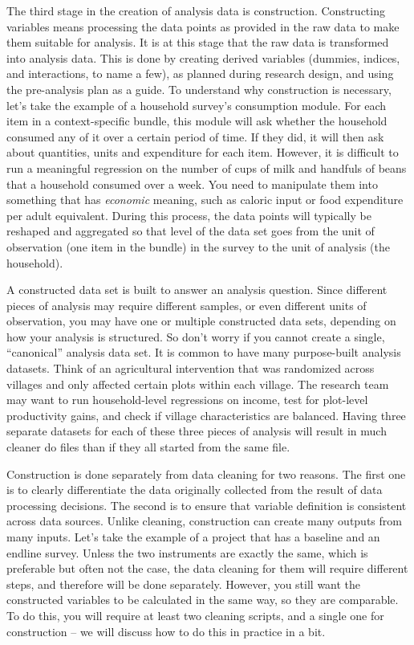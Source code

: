The third stage in the creation of analysis data is construction.
Constructing variables means processing the data points as provided in the raw data to make them suitable for analysis.
It is at this stage that the raw data is transformed into analysis data.
This is done by creating derived variables (dummies, indices, and interactions, to name a few),
as planned during research design,
and using the pre-analysis plan as a guide.
To understand why construction is necessary,
let's take the example of a household survey's consumption module.
For each item in a context-specific bundle,
this module will ask whether the household consumed any of it over a certain period of time.
If they did, it will then ask about quantities, units and expenditure for each item.
However, it is difficult to run a meaningful regression
on the number of cups of milk and handfuls of beans that a household consumed over a week.
You need to manipulate them into something that has \textit{economic} meaning,
such as caloric input or food expenditure per adult equivalent.
During this process, the data points will typically be reshaped and aggregated
so that level of the data set goes from the unit of observation
(one item in the bundle) in the survey to the unit of analysis (the household).

A constructed data set is built to answer an analysis question.
Since different pieces of analysis may require different samples,
or even different units of observation,
you may have one or multiple constructed data sets,
depending on how your analysis is structured.
So don't worry if you cannot create a single, ``canonical'' analysis data set.
It is common to have many purpose-built analysis datasets.
Think of an agricultural intervention that was randomized across villages
and only affected certain plots within each village.
The research team may want to run household-level regressions on income,
test for plot-level productivity gains,
and check if village characteristics are balanced.
Having three separate datasets for each of these three pieces of analysis
will result in much cleaner do files than if they all started from the same file.

Construction is done separately from data cleaning for two reasons.
The first one is to clearly differentiate the data originally collected
from the result of data processing decisions.
The second is to ensure that variable definition is consistent across data sources.
Unlike cleaning, construction can create many outputs from many inputs.
Let's take the example of a project that has a baseline and an endline survey.
Unless the two instruments are exactly the same,
which is preferable but often not the case,
the data cleaning for them will require different steps,
and therefore will be done separately.
However, you still want the constructed variables to be calculated in the same way, so they are comparable.
To do this, you will require at least two cleaning scripts,
and a single one for construction --
we will discuss how to do this in practice in a bit.

